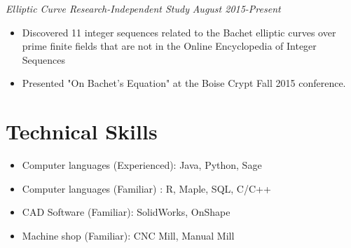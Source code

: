 \documentclass[letterpaper]{article}
\begin{document}
\vspace{.05in}
\begin{multicols}{2}
\textit{Elliptic Curve Research-Independent Study}
\vfill
\columnbreak
\textit{August 2015-Present}
\end{multicols}
\begin{itemize}
    \item Discovered 11 integer sequences related to the Bachet elliptic curves over prime finite fields that are not in the Online Encyclopedia of Integer Sequences
    \item Presented "On Bachet's Equation" at the Boise Crypt Fall 2015 conference.
\end{itemize}

\section*{Technical Skills}
\begin{itemize}
\item Computer languages (Experienced): Java, Python, Sage 
\item Computer languages (Familiar) : R, Maple, SQL, C/C++
\item CAD Software (Familiar): SolidWorks, OnShape
\item Machine shop (Familiar): CNC Mill, Manual Mill
\end{itemize}

%
%
\end{document}
